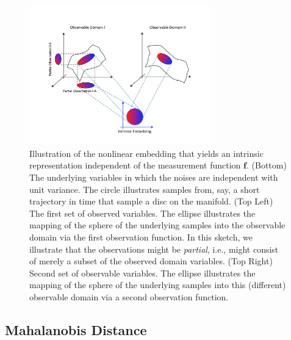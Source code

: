 \documentclass[aip,jcp,preprint]{revtex4-1}
\begin{document}
\begin{figure}[ht]
\includegraphics[width=0.7\textwidth]{IntrinsicEmbeddingIllustration2}
\caption{Illustration of the nonlinear embedding that yields an intrinsic representation independent of the measurement function $\mathbf{f}$. (Bottom) The underlying variables in which the noises are independent with unit variance. The circle illustrates samples from, say, a short trajectory in time that sample a disc on the manifold. (Top Left) The first set of observed variables. The ellipse illustrates the mapping of the sphere of the underlying samples into the observable domain via the first observation function. In this sketch, we illustrate that the observations might be {\em partial}, i.e., might consist of merely a subset of the observed domain variables. (Top Right) Second set of observable variables. The ellipse illustrates the mapping of the sphere of the underlying samples into this (different) observable domain via a second observation function.
\label{fig:IntrinsicIllustration}}
\end{figure}

\subsection{Mahalanobis Distance}
\label{subsec:mahalanobis}
\end{document}
